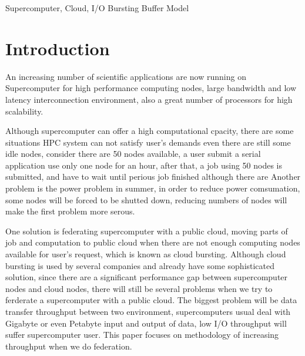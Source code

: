 \documentclass[JIP,draft]{ipsj}
\begin{document}
\begin{keyword}
Supercomputer, Cloud, I/O Bursting Buffer Model
\end{keyword}

\maketitle

\section{Introduction}
An increasing number of scientific applications are now running on Supercomputer for high performance computing nodes, large bandwidth and low latency interconnection environment, also a great number of processors for high scalability.

Although supercomputer can offer a high computational cpacity, there are some situations HPC system can not satisfy user's demands even there are still some idle nodes, consider there are 50 nodes available, a user submit a serial application use only one node for an hour, after that, a job using 50 nodes is submitted, and have to wait until perious job finished although there are
Another problem is the power problem in summer, in order to reduce power comsumation, some nodes will be forced to be shutted down, reducing numbers of nodes will make the first problem more serous.

One solution is federating supercomputer with a public cloud, moving parts of job and computation to public cloud when there are not enough computing nodes available for user's request, which is known as cloud bursting.
Although cloud bursting is used by several companies and already have some sophisticated solution, since there are a significant performance gap between supercomputer nodes and cloud nodes, there will still be several problems when we try to ferderate a supercomputer with a public cloud.
The biggest problem will be data transfer throughput between two environment, supercomputers usual deal with Gigabyte or even Petabyte input and output of data, low I/O throughput will suffer supercomputer user. This paper focuses on methodology of increasing throughput when we do federation.
\end{document}
